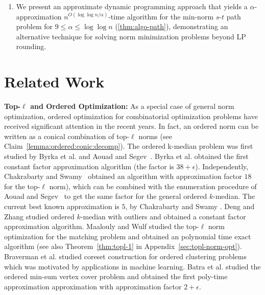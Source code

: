 \documentclass[11pt,a4paper]{article} \usepackage{enumitem}
\theoremstyle{definition}
\begin{document}
\begin{enumerate}
    \item We present an approximate dynamic programming approach that yields a $\alpha$-approximation $n^{O(\log\log n/\alpha)}$-time algorithm for the min-norm $s$-$t$ path problem for $9\le \alpha\le \log\log n$ (\cref{thm:algo-path}), demonstrating an alternative technique for solving norm minimization problems beyond LP rounding.
        
\end{enumerate}



\section{Related Work}









\vspace{0.2cm}
{\bf Top-$\ell$ and Ordered Optimization:}
As a special case of general norm optimization, ordered optimization for combinatorial optimization problems have received significant attention in the recent years. 
In fact, an ordered norm can be written as a conical combination of top-$\ell$ norms
(see Claim~\ref{lemma:ordered:conic:decomp}).
The ordered k-median problem was first studied by Byrka et al. \cite{byrka2018constant} and Aouad and Segev~\cite{aouad2019ordered}.
Byrka et al. \cite{byrka2018constant} obtained the first constant factor approximation algorithm (the factor is $38+\epsilon$).
Independently, Chakrabarty and Swamy~\cite{chakrabarty2018interpolating} obtained 
an algorithm with approximation factor $18$ for the top-$\ell$ norm), which can be combined with the enumeration procedure of Aouad and Segev~\cite{aouad2019ordered} to get the same factor for the general ordered $k$-median.
The current best known approximation is $5$, by Chakrabarty and Swamy \cite{chakrabarty2019approximation}.
Deng and Zhang \cite{deng2020ordered} studied ordered $k$-median with outliers and obtained a constant factor approximation algorithm.
Maalouly and Wulf \cite{maalouly2022exact} studied the top-$\ell$ norm optimization for 
the matching problem and obtained an polynomial time exact algorithm
(see also Theorem~\ref{thm:topl-1} in Appendix~\ref{sec:topl-norm-opt}).
Braverman et al. studied coreset construction for ordered clustering problems \cite{braverman2019coresets} which was motivated by applications in machine learning.
Batra et al. \cite{batra2023tight} studied the ordered min-sum vertex cover problem and obtained the first poly-time approximation approximation with approximation factor $2+\epsilon$.
\end{document}

